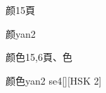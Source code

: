 \begin{entry}{颜}{15}{⾴}
  \begin{phonetics}{颜}{yan2}
  \end{phonetics}
\end{entry}

\begin{entry}{颜色}{15,6}{⾴、⾊}
  \begin{phonetics}{颜色}{yan2 se4}[][HSK 2]
  \end{phonetics}
\end{entry}


